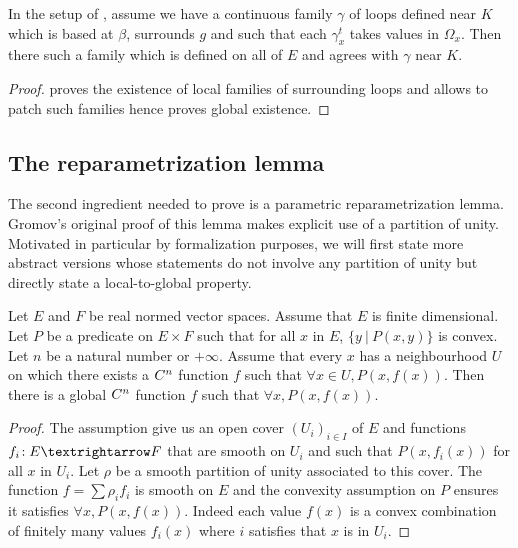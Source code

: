 \begin{lemma}
  \label{lem:∃_surrounding_loops}
  \leanok
  In the setup of , assume we have a
  continuous family $γ$ of loops defined near $K$ which is based at $β$,
  surrounds $g$ and such that each $γ_x^t$ takes values in $Ω_x$.
  Then there such a family which is defined on all of $E$ and agrees
  with $γ$ near $K$.
\end{lemma}

\begin{proof}
  \leanok
   proves the existence of local families of surrounding
  loops and  allows to patch such families hence
   proves global existence.
\end{proof}

\subsection{The reparametrization lemma}
\label{sub:the_reparametrization_lemma}

The second ingredient needed to prove  is a
parametric reparametrization lemma. Gromov's original proof of this lemma makes
explicit use of a partition of unity. Motivated in particular by formalization
purposes, we will first state more abstract versions whose statements do not involve
any partition of unity but directly state a local-to-global property.

\begin{lemma}
  \label{lem:exists_cont_diff_of_convex}
  \leanok
  Let $E$ and $F$ be real normed vector spaces. Assume that $E$ is finite
  dimensional. Let $P$ be a predicate on $E \times F$ such that for all $x$ in
  $E$, $\{y ~|~ P (x, y) \}$ is convex. Let $n$ be a natural number or $+\infty$.
  Assume that every $x$ has a neighbourhood $U$ on which there exists a $C^n$
  function $f$ such that $\forall x ∈ U, P(x, f(x))$. Then there is a global
  $C^n$ function $f$ such that $\forall x, P(x, f(x))$.
\end{lemma}

\begin{proof}
  \leanok
  The assumption give us an open cover $(U_i)_{i ∈ I}$ of $E$ and functions
  $f_i \co E → F$ that are smooth on $U_i$ and such that $P(x, f_i(x))$ for all $x$ in $U_i$.
  Let $ρ$ be a smooth partition of unity associated to this cover. The function
  $f = ∑ ρ_i f_i$ is smooth on $E$ and the convexity assumption on $P$ ensures
  it satisfies $\forall x, P(x, f(x))$. Indeed each value $f(x)$ is a convex combination
  of finitely many values $f_i(x)$ where $i$ satisfies that $x$ is in $U_i$.
\end{proof}

